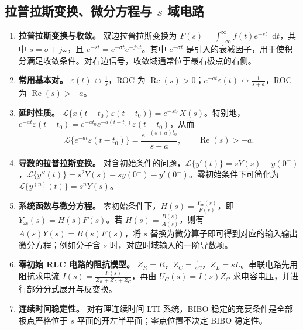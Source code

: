\documentclass[12pt,a4paper]{ctexart}
\newcommand{\eps}{\varepsilon}
\newcommand{\dif}{\mathop{}\!\mathrm{d}}
\begin{document}
\subsection{拉普拉斯变换、微分方程与 $s$ 域电路}
\begin{enumerate}
\item \textbf{拉普拉斯变换与收敛。} 双边拉普拉斯变换为 \(\displaystyle F(s)=\int_{-\infty}^{\infty}f(t)e^{-st}\dif t\)，其中 \(\displaystyle s=\sigma+j\omega\)，且 \(\displaystyle e^{-st}=e^{-\sigma t}e^{-j\omega t}\)。其中 $e^{-\sigma t}$ 是引入的衰减因子，用于使积分满足收敛条件。对右边信号，收敛域通常位于最右极点的右侧。

\item \textbf{常用基本对。} \(\displaystyle \eps(t)\longleftrightarrow\frac1s\)，ROC 为 $\operatorname{Re}(s)>0$；\(\displaystyle e^{-at}\eps(t)\longleftrightarrow\frac1{s+a}\)，ROC 为 $\operatorname{Re}(s)>-a$。

\item \textbf{延时性质。} \(\displaystyle \mathcal L\{x(t-t_0)\eps(t-t_0)\}=e^{-st_0}X(s)\)。特别地，\(\displaystyle e^{-at}\eps(t-t_0)=e^{-at_0}e^{-a(t-t_0)}\eps(t-t_0)\)，从而 \[\mathcal L\{e^{-at}\eps(t-t_0)\}=\frac{e^{-(s+a)t_0}}{s+a},\qquad \operatorname{Re}(s)>-a.\]

\item \textbf{导数的拉普拉斯变换。} 对含初始条件的问题，\(\displaystyle \mathcal L\{y'(t)\}=sY(s)-y(0^-)\)，\(\displaystyle \mathcal L\{y''(t)\}=s^2Y(s)-sy(0^-)-y'(0^-)\)。零初始条件下可简化为 \(\displaystyle \mathcal L\{y^{(n)}(t)\}=s^nY(s)\)。

\item \textbf{系统函数与微分方程。} 零初始条件下，\(\displaystyle H(s)=\frac{Y_{\mathrm{zs}}(s)}{F(s)}\)，即 \(\displaystyle Y_{\mathrm{zs}}(s)=H(s)F(s)\)。若 \(\displaystyle H(s)=\frac{B(s)}{A(s)}\)，则有 \(\displaystyle A(s)Y(s)=B(s)F(s)\)，将 $s$ 替换为微分算子即可得到对应的输入输出微分方程；例如分子含 $s$ 时，对应时域输入的一阶导数项。

\item \textbf{零初始 RLC 电路的阻抗模型。} \(\displaystyle Z_R=R\)，\(\displaystyle Z_C=\frac1{sC}\)，\(\displaystyle Z_L=sL\)。串联电路先用阻抗求电流 \(\displaystyle I(s)=\frac{F(s)}{Z_R+Z_L+Z_C}\)，再由 \(\displaystyle U_C(s)=I(s)Z_C\) 求电容电压，并进行部分分式展开与反变换。

\item \textbf{连续时间稳定性。} 对有理连续时间 LTI 系统，BIBO 稳定的充要条件是全部极点严格位于 $s$ 平面的开左半平面；零点位置不决定 BIBO 稳定性。
\end{enumerate}
\end{document}
